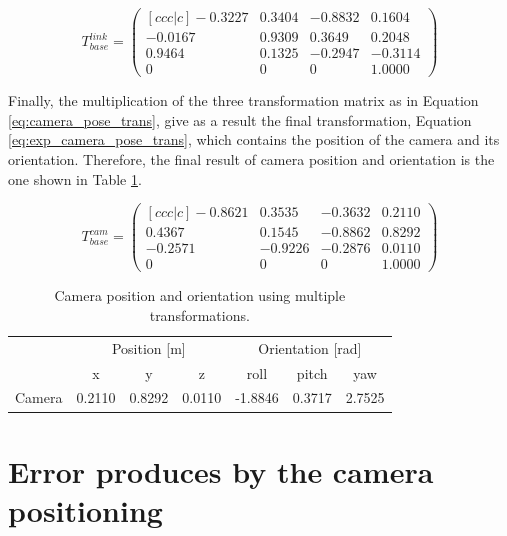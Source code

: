 \documentclass[12pt,a4paper,final,twoside,openright]{report}
\begin{document}
\begin{equation}\label{eq:exp_transform_3}
T_{base}^{link} = \begin{pmatrix}[ccc|c]
   -0.3227  &  0.3404 &  -0.8832 &   0.1604\\
   -0.0167  &  0.9309  &  0.3649   & 0.2048\\
    0.9464 &   0.1325 &  -0.2947  & -0.3114\\ \hline
         0  &       0  &       0  &  1.0000
\end{pmatrix}
\end{equation}

Finally, the multiplication of the three transformation matrix as in Equation \eqref{eq:camera_pose_trans}, give as a result the final transformation, Equation \eqref{eq:exp_camera_pose_trans}, which contains the position of the camera and its orientation. Therefore, the final result of camera position and orientation is the one shown in Table \ref{tab:exp_visual_camera_transform_result}.

\begin{equation}\label{eq:exp_camera_pose_trans}
T_{base}^{cam} = \begin{pmatrix}[ccc|c]
   -0.8621  &  0.3535  & -0.3632   & 0.2110\\
    0.4367 &   0.1545 &  -0.8862  &  0.8292\\
   -0.2571  & -0.9226 &  -0.2876  &  0.0110\\ \hline
        0    &     0     &    0  &  1.0000
\end{pmatrix}
\end{equation}

\begin{table}[h]
\begin{center}
\begin{tabular}{|l|c|c|c|c|c|c|}
\hline
 & \multicolumn{3}{|c|}{Position [m]} & \multicolumn{3}{|c|}{Orientation [rad]} \\ \cline{2-7}
 & x & y & z & roll & pitch & yaw \\ \hline
Camera & 0.2110 & 0.8292 & 0.0110 & -1.8846 & 0.3717 & 2.7525 \\ \hline
\end{tabular}
\caption{Camera position and orientation using multiple transformations.\label{tab:exp_visual_camera_transform_result}}
\end{center}
\end{table}

\section{Error produces by the camera positioning}
\end{document}
